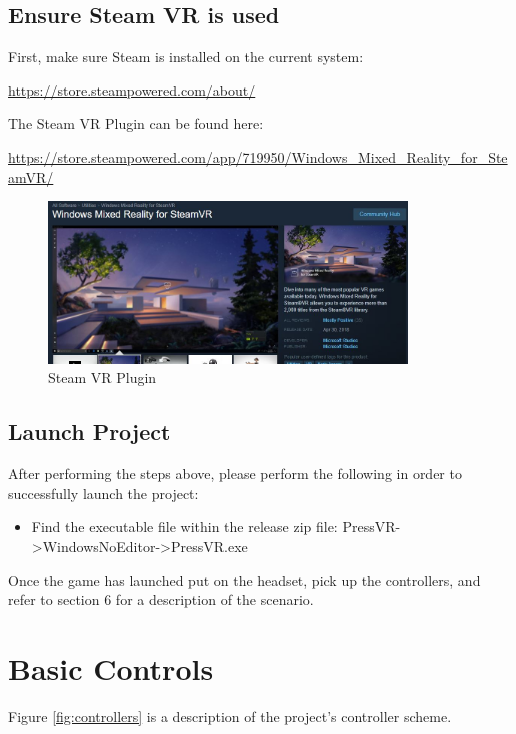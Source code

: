 \documentclass[onecolumn, draftclsnofoot,10pt, compsoc]{IEEEtran}
\begin{document}
\subsection{Ensure Steam VR is used}

First, make sure Steam is installed on the current system:

\noindent
\href{https://store.steampowered.com/about/}{https://store.steampowered.com/about/}

\noindent
The Steam VR Plugin can be found here: 

\noindent 
\href{https://store.steampowered.com/app/719950/Windows_Mixed_Reality_for_SteamVR/}{https://store.steampowered.com/app/719950/Windows\_Mixed\_Reality\_for\_SteamVR/}\\

\begin{figure}[ht!]
    \centering
    \includegraphics[width=0.85\textwidth]{steamplugin.JPG}
    \caption{Steam VR Plugin}
    \label{fig:printerModel}
\end{figure}

\subsection{Launch Project}

After performing the steps above, please perform the following in order to successfully launch the project: 
\begin{itemize}
    \item Find the executable file within the release zip file: PressVR->WindowsNoEditor->PressVR.exe
\end{itemize}

Once the game has launched put on the headset, pick up the controllers, and refer to section 6 for a description of the scenario.


\section{Basic Controls}
 Figure \ref{fig:controllers} is a description of the project's controller scheme.
\end{document}
